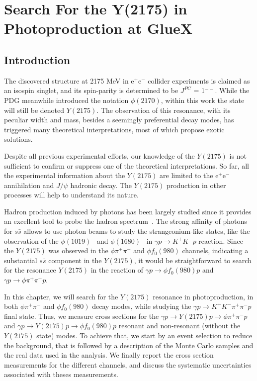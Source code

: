 \chapter{Search For the Y(2175) in Photoproduction at GlueX}
\label{chap.y2175}

\section{Introduction}
\label{chap.y2175.intro}

The discovered structure at 2175 MeV in e$^+$e$^{-}$ collider experiments is claimed as an isospin singlet, and its spin-parity is determined to be $J^{PC}$ = 1$^{--}$. While the PDG meanwhile introduced the notation $\phi(2170)$, within this work the state will still be denoted $Y(2175)$. The observation of this resonance, with its peculiar width and mass, besides a seemingly preferential decay modes, has triggered many theoretical interpretations, most of which propose exotic solutions. 
~\par Despite all previous experimental efforts, our knowledge of the $Y(2175)$ is not sufficient to confirm or suppress one of the theoretical interpretations. So far, all the experimental information about the $Y(2175)$ are limited to the e$^+$e$^{-}$ annihilation and $J/\psi$ hadronic decay. The $Y(2175)$ production in other processes will help to understand its nature.
~\par Hadron production induced by photons has been largely studied since it provides an excellent tool to probe the hadron spectrum~\cite{Ballam68, Meyer70, Wang14, Wang17}. The strong affinity of photons for $s\bar{s}$ allows to use photon beams to study the strangeonium-like states, like the observation of the $\phi(1019)$~\cite{Mibe05} and $\phi(1680)$~\cite{Aston81} in $\gamma p \rightarrow K^{+}K^{-}p$ reaction. Since the $Y(2175)$ was observed in the $\phi \pi^{+}\pi^{-}$ and $\phi f_{0}(980)$ channels, indicating a substantial $s\bar{s}$ component in the $Y(2175)$, it would be straightforward to search for the resonance $Y(2175)$ in the reaction of $\gamma p \rightarrow \phi f_{0}(980)p$ and $\gamma p \rightarrow \phi \pi^{+}\pi^{-}p$.
~\par In this chapter, we will search for the $Y(2175)$ resonance in photoproduction, in both $\phi \pi^{+}\pi^{-}$ and $\phi f_{0}(980)$ decay modes, while studying the $\gamma p \rightarrow K^{+}K^{-} \pi^{+}\pi^{-} p$ final state. Thus, we measure cross sections for the $\gamma p \rightarrow Y(2175) p \rightarrow \phi \pi^+ \pi^{-} p$ and $\gamma p \rightarrow Y(2175) p \rightarrow \phi f_{0}(980) p$ resonant and non-resonant (without the $Y(2175)$ state) modes. To achieve that, we start by an event selection to reduce the background, that is followed by a description of the Monte Carlo samples and the real data used in the analysis. We finally report the cross section measurements for the different channels, and discuss the systematic uncertainties associated with theses measurements.

